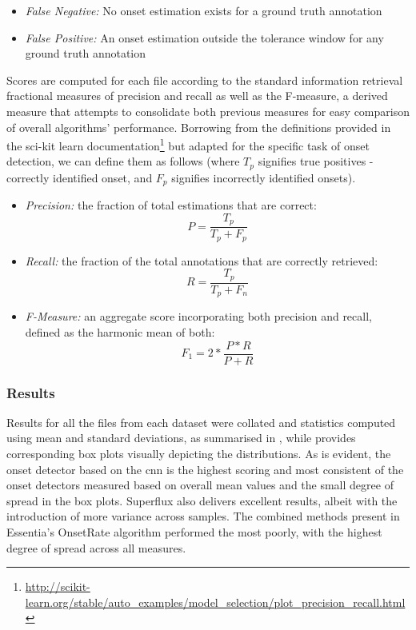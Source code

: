 \begin{itemize}
  \item \textit{False Negative:} No onset estimation exists for a ground truth annotation
  \item \textit{False Positive:} An onset estimation outside the tolerance window for any ground truth annotation
\end{itemize}

Scores are computed for each file according to the standard information retrieval fractional measures of precision and recall as well as the F-measure, a derived measure that attempts to consolidate both previous measures for easy comparison of overall algorithms’ performance. Borrowing from the definitions provided in the sci-kit learn documentation\footnote{\url{http://scikit-learn.org/stable/auto_examples/model_selection/plot_precision_recall.html}} but adapted for the specific task of onset detection, we can define them as follows (where $T_p$ signifies true positives - correctly identified onset, and $F_p$ signifies incorrectly identified onsets).

\begin{itemize}
  \item \textit{Precision:} the fraction of total estimations that are correct:
\begin{equation}
\label{eq:Precision}	
P=\frac{T_{p}}{T_{p}+F_{p}}
\end{equation}  

  \item \textit{Recall:} the fraction of the total annotations that are correctly retrieved:
\begin{equation}
\label{eq:Precision}	
R=\frac{T_{p}}{T_{p}+F_{n}}
\end{equation}  

  \item \textit{F-Measure:} an aggregate score incorporating both precision and recall, defined as the harmonic mean of both:
\begin{equation}
\label{eq:Precision}	
F_{1}=2*\frac{P*R}{P+R}
\end{equation}  

\end{itemize}

\subsubsection{Results}

Results for all the files from each dataset were collated and statistics computed using mean and standard deviations, as summarised in , while  provides corresponding box plots visually depicting the distributions. As is evident, the onset detector based on the \acrfull{cnn} is the highest scoring and most consistent of the onset detectors measured based on overall mean values and the small degree of spread in the box plots. Superflux also delivers excellent results, albeit with the introduction of more variance across samples. The combined methods present in Essentia's OnsetRate algorithm performed the most poorly, with the highest degree of spread across all measures.

